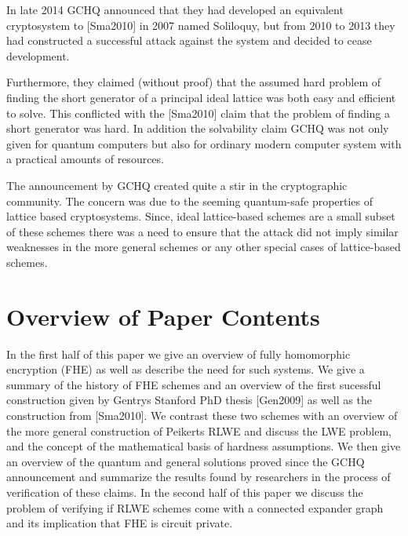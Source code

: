 In late 2014 GCHQ announced that they had developed an equivalent
cryptosystem to [Sma2010] in 2007 named Soliloquy, but from 2010 to
2013 they had constructed a successful attack against the system and
decided to cease development.

Furthermore, they claimed (without proof) that the assumed hard
problem of finding the short generator of a principal ideal lattice was
both easy and efficient to solve. This conflicted with the [Sma2010]
claim that the problem of finding a short generator was hard. In
addition the solvability claim GCHQ was not only given for quantum
computers but also for ordinary modern computer system with a practical
amounts of resources.

The announcement by GCHQ created quite a stir in the cryptographic
community. The concern was due to the seeming quantum-safe properties
of lattice based cryptosystems. Since, ideal lattice-based schemes are
a small subset of these schemes there was a need to ensure that the
attack did not imply similar weaknesses in the more general schemes or
any other special cases of lattice-based schemes.

\section{Overview of Paper Contents}

In the first half of this paper we give an overview of fully
homomorphic encryption (FHE) as well as describe the need for such
systems.
We give a summary of the history of FHE schemes and an overview of
the first sucessful construction given by Gentrys Stanford PhD thesis
[Gen2009] as well as the construction from [Sma2010].
We contrast these two schemes with an overview of the more general
construction of Peikerts RLWE and discuss the LWE problem, and the
concept of the mathematical basis of hardness assumptions.
We then give an overview of the quantum and general solutions proved
since the GCHQ announcement and summarize the results found by
researchers in the process of verification of these claims.
In the second half of this paper we discuss the problem of verifying
if RLWE schemes come with a connected expander graph and its
implication that FHE is circuit private.

